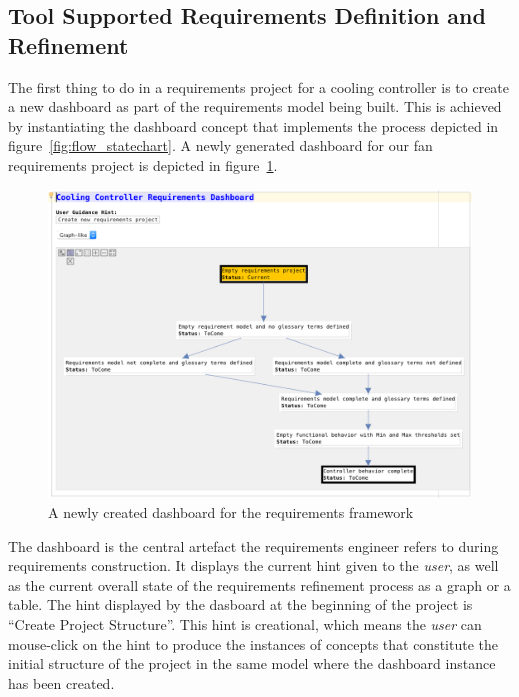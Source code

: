 \subsection*{Tool Supported Requirements Definition and Refinement}
\vspace{-.3cm}
The first thing to do in a requirements project for a cooling controller is to
create a new dashboard as part of the requirements model being built. This is
achieved by instantiating the \textsf{dashboard} concept that implements the
process depicted in figure~\ref{fig:flow_statechart}. A newly generated
dashboard for our fan requirements project is depicted in figure~\ref{fig:empty_dashboard}.
\vspace{-.6cm}
\begin{figure}[!h]
\centering 
\includegraphics[width=.8\textwidth]{./figures/NewDashboard.png}
\caption{A newly created dashboard for the requirements framework}
\label{fig:empty_dashboard}
\vspace{-.6cm}
\end{figure}
The dashboard is the central artefact the requirements engineer refers to during
requirements construction. It displays the current hint given to the
\emph{user}, as well as the current overall state of the requirements refinement
process as a graph or a table. The hint displayed by the dasboard at the
beginning of the project is ``Create Project Structure''. This hint is
creational, which means the \emph{user} can mouse-click on the hint to produce
the instances of concepts that constitute the initial structure of the project in the same model where the
dashboard instance has been created.

